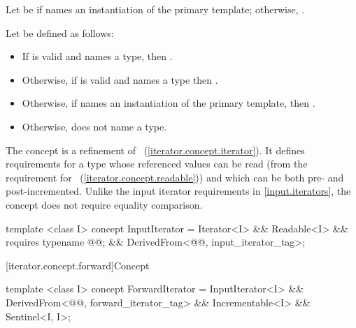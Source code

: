 \begin{addedblock}
\pnum
Let  be  if 
names an instantiation of the primary template; otherwise, .

\pnum
Let  be defined as follows:
\begin{itemize}
\item If  is valid
  and names a type, then .
\item Otherwise, if  is valid
  and names a type then .
\item Otherwise, if  names an instantiation of
  the primary template, then .
\item Otherwise,  does not name a type.
\end{itemize}
\end{addedblock}

\pnum
The  concept is a refinement of
~(\ref{iterator.concept.iterator}). It defines requirements for a type
whose referenced values can be read (from the requirement for
~(\ref{iterator.concept.readable})) and which can be both pre- and
post-incremented.
\enternote Unlike the input iterator requirements in \ref{input.iterators},
the  concept does not require equality comparison.\exitnote

%
\begin{codeblock}
  template <class I>
  concept InputIterator =
    Iterator<I> &&
    Readable<I> &&
    requires { typename @@; } &&
    DerivedFrom<@@, input_iterator_tag>;
\end{codeblock}

\setcounter{subsubsection}{12}
[iterator.concept.forward]{Concept }


%
\begin{codeblock}
  template <class I>
  concept ForwardIterator =
    InputIterator<I> &&
    DerivedFrom<@@, forward_iterator_tag> &&
    Incrementable<I> &&
    Sentinel<I, I>;
\end{codeblock}

